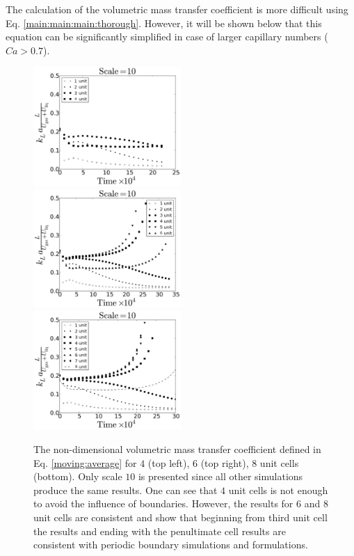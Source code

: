 \documentclass[review,12pt]{elsarticle}
\begin{document}
The calculation of the  volumetric mass transfer coefficient is more difficult
using Eq. \ref{main:main:main:thorough}. However, it will be shown below that
this equation can be significantly simplified in case of larger capillary
numbers ($Ca>0.7$).

\begin{figure}[htb!]
\includegraphics[width=0.5\textwidth]{aver_moving_window4scale10.eps}
\includegraphics[width=0.5\textwidth]{aver_moving_window6scale10.eps}\\
\includegraphics[width=0.5\textwidth]{aver_moving_window8scale10.eps}
\caption{The non-dimensional volumetric mass transfer coefficient defined in Eq.
\ref{moving:average} for $4$ (top left), $6$ (top right), $8$ unit cells (bottom). Only scale
$10$ is presented since all other simulations produce the same results. One can see that $4$ unit
cells is not enough to avoid the influence of boundaries. However, the results for $6$ and $8$
unit cells are consistent and show that beginning from third unit cell the results and ending with
the penultimate cell results are consistent with periodic boundary simulations and
\citet{vanbaten-circular} formulations.
\label{fig:moving:average:ca0097}}
\end{figure}
\end{document}
